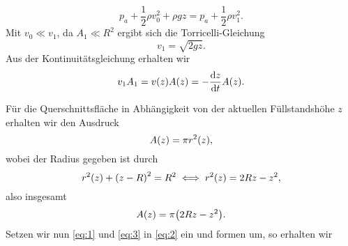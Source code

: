 \documentclass{exercise}
\begin{document}
\begin{enumerate}
        \[
            p_a + \frac{1}{2}\rho v_0^2 + \rho gz = p_a + \frac{1}{2}\rho v_1^2.
        \]
        Mit \(v_0 \ll v_1\), da \(A_1 \ll R^2\) ergibt sich die Torricelli-Gleichung
        \begin{equation}\label{eq:1}
            v_1 = \sqrt{2gz}.
        \end{equation}
        Aus der Kontinuitätsgleichung erhalten wir
        \begin{equation}\label{eq:2}
            v_1 A_1 = v\parentheses*{z}A\parentheses*{z} = -\frac{\d z}{\d t}A\parentheses*{z}.
        \end{equation}
        \begin{center}
        \end{center}
        Für die Querschnittsfläche in Abhängigkeit von der aktuellen Füllstandshöhe \(z\) erhalten wir den Ausdruck
        \[
            A\parentheses*{z} = \pi r^2\parentheses*{z},
        \]
        wobei der Radius gegeben ist durch
        \[
            r^2\parentheses*{z} + \parentheses*{z - R}^2 = R^2 \iff r^2\parentheses*{z} = 2Rz - z^2,
        \]
        also insgesamt
        \begin{equation}\label{eq:3}
            A\parentheses*{z} = \pi\parentheses*{2Rz - z^2}.
        \end{equation}
        Setzen wir nun \eqref{eq:1} und \eqref{eq:3} in \eqref{eq:2} ein und formen um, so erhalten wir
        \begin{align*}

\end{align*}
\end{enumerate}
\end{document}
